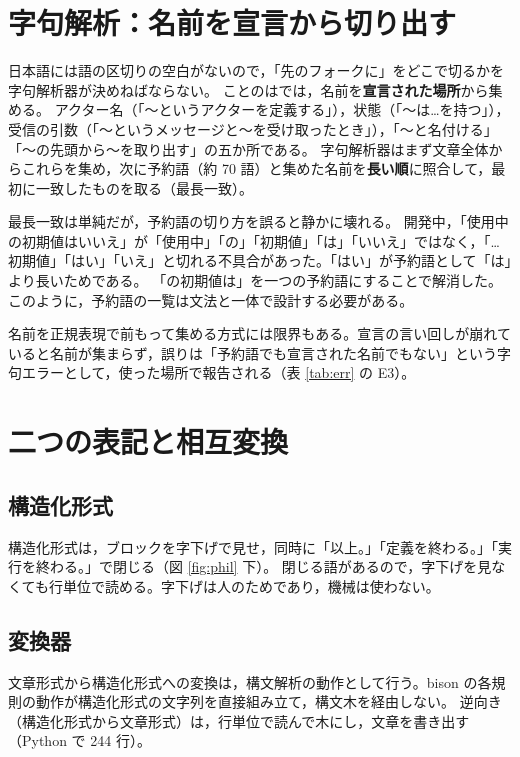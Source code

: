 \documentclass[a4paper,10pt]{ltjsarticle}
\begin{document}
\section{字句解析：名前を宣言から切り出す}\label{sec:lex}

日本語には語の区切りの空白がないので，「先のフォークに」をどこで切るかを字句解析器が決めねばならない。
ことのはでは，名前を\textbf{宣言された場所}から集める。
アクター名（「〜というアクターを定義する」），状態（「〜は…を持つ」），受信の引数（「〜というメッセージと〜を受け取ったとき」），「〜と名付ける」「〜の先頭から〜を取り出す」の五か所である。
字句解析器はまず文章全体からこれらを集め，次に予約語（約 70 語）と集めた名前を\textbf{長い順}に照合して，最初に一致したものを取る（最長一致）。

最長一致は単純だが，予約語の切り方を誤ると静かに壊れる。
開発中，「使用中の初期値はいいえ」が「使用中」「の」「初期値」「は」「いいえ」ではなく，「…初期値」「はい」「いえ」と切れる不具合があった。「はい」が予約語として「は」より長いためである。
「の初期値は」を一つの予約語にすることで解消した。
このように，予約語の一覧は文法と一体で設計する必要がある。

名前を正規表現で前もって集める方式には限界もある。宣言の言い回しが崩れていると名前が集まらず，誤りは「予約語でも宣言された名前でもない」という字句エラーとして，使った場所で報告される（表 \ref{tab:err} の E3）。

\section{二つの表記と相互変換}\label{sec:conv}

\subsection{構造化形式}

構造化形式は，ブロックを字下げで見せ，同時に「以上。」「定義を終わる。」「実行を終わる。」で閉じる（図 \ref{fig:phil} 下）。
閉じる語があるので，字下げを見なくても行単位で読める。字下げは人のためであり，機械は使わない。

\subsection{変換器}

文章形式から構造化形式への変換は，構文解析の動作として行う。bison の各規則の動作が構造化形式の文字列を直接組み立て，構文木を経由しない。
逆向き（構造化形式から文章形式）は，行単位で読んで木にし，文章を書き出す（Python で 244 行）。
\end{document}
